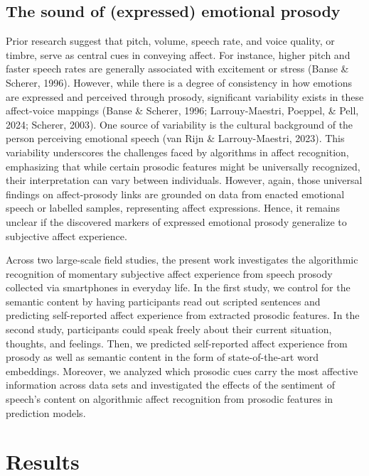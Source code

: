 \documentclass[
  english,
  man,floatsintext]{apa6}
\begin{document}
\hypertarget{the-sound-of-expressed-emotional-prosody}{%
\subsection{The sound of (expressed) emotional prosody}\label{the-sound-of-expressed-emotional-prosody}}

Prior research suggest that pitch, volume, speech rate, and voice quality, or timbre, serve as central cues in conveying affect. For instance, higher pitch and faster speech rates are generally associated with excitement or stress (Banse \& Scherer, 1996). However, while there is a degree of consistency in how emotions are expressed and perceived through prosody, significant variability exists in these affect-voice mappings (Banse \& Scherer, 1996; Larrouy-Maestri, Poeppel, \& Pell, 2024; Scherer, 2003). One source of variability is the cultural background of the person perceiving emotional speech (van Rijn \& Larrouy-Maestri, 2023). This variability underscores the challenges faced by algorithms in affect recognition, emphasizing that while certain prosodic features might be universally recognized, their interpretation can vary between individuals. However, again, those universal findings on affect-prosody links are grounded on data from enacted emotional speech or labelled samples, representing affect expressions. Hence, it remains unclear if the discovered markers of expressed emotional prosody generalize to subjective affect experience.

Across two large-scale field studies, the present work investigates the algorithmic recognition of momentary subjective affect experience from speech prosody collected via smartphones in everyday life. In the first study, we control for the semantic content by having participants read out scripted sentences and predicting self-reported affect experience from extracted prosodic features. In the second study, participants could speak freely about their current situation, thoughts, and feelings. Then, we predicted self-reported affect experience from prosody as well as semantic content in the form of state-of-the-art word embeddings. Moreover, we analyzed which prosodic cues carry the most affective information across data sets and investigated the effects of the sentiment of speech's content on algorithmic affect recognition from prosodic features in prediction models.

\hypertarget{results}{%
\section{Results}\label{results}}
\end{document}
